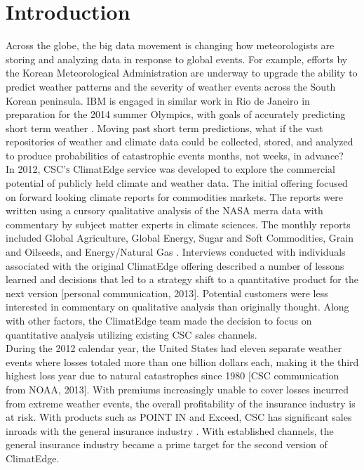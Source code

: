 \section{Introduction}
Across the globe, the big data movement is changing how meteorologists are storing and analyzing data in response to global events. For example, efforts by the Korean Meteorological Administration are underway to upgrade the ability to predict weather patterns and the severity of weather events across the South Korean peninsula. IBM is engaged in similar work in Rio de Janeiro in preparation for the 2014 summer Olympics, with goals of accurately predicting short term weather \cite{rwe}. Moving past short term predictions, what if the vast repositories of weather and climate data could be collected, stored, and analyzed to produce probabilities of catastrophic events months, not weeks, in advance?\\

In 2012, \textsc{CSC's} ClimatEdge\texttrademark{} service was developed to explore the commercial potential of publicly held climate and weather data. The initial offering focused on forward looking climate reports for commodities markets. The reports were written using a cursory qualitative analysis of the NASA \gls{merra} data with commentary by subject matter experts in climate sciences. The monthly reports included Global Agriculture, Global Energy, Sugar and Soft Commodities, Grain and Oilseeds, and Energy/Natural Gas \cite{climatedgeurl}. Interviews conducted with individuals associated with the original ClimatEdge offering described a number of lessons learned and decisions that led to a strategy shift to a quantitative product for the next version [personal communication, 2013]. Potential customers were less interested in commentary on qualitative analysis than originally thought. Along with other factors, the ClimatEdge team made the decision to focus on quantitative analysis utilizing existing CSC sales channels.\\

During the 2012 calendar year, the United States had eleven separate weather events where losses totaled more than one billion dollars each, making it the third highest loss year due to natural catastrophes since 1980 [\textsc{CSC} communication from NOAA, 2013]. With premiums increasingly unable to cover losses incurred from extreme weather events, the overall profitability of the insurance industry is at risk. With products such as POINT IN  and Exceed, \textsc{CSC} has significant sales inroads with the general insurance industry \cite{point_in} \cite{exceed}. With established channels, the general insurance industry became a prime target for the second version of ClimatEdge.\\

